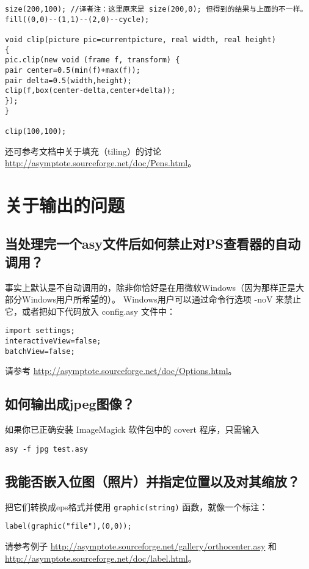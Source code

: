 \begin{lstlisting}
size(200,100); //译者注：这里原来是 size(200,0); 但得到的结果与上面的不一样。
fill((0,0)--(1,1)--(2,0)--cycle);
 
void clip(picture pic=currentpicture, real width, real height) 
{
pic.clip(new void (frame f, transform) { 
pair center=0.5(min(f)+max(f));
pair delta=0.5(width,height);
clip(f,box(center-delta,center+delta));
});
} 
 
clip(100,100);
\end{lstlisting}

还可参考文档中关于填充（tiling）的讨论 \url{http://asymptote.sourceforge.net/doc/Pens.html}。

\section{\label{Q9}关于输出的问题}
\subsection{\label{Q9.1}当处理完一个asy文件后如何禁止对PS查看器的自动调用？}
事实上默认是不自动调用的，除非你恰好是在用微软Windows（因为那样正是大部分Windows用户所希望的）。
Windows用户可以通过命令行选项 -noV 来禁止它，或者把如下代码放入 config.asy 文件中：
\begin{lstlisting}
import settings;
interactiveView=false;
batchView=false;
\end{lstlisting}
请参考 \url{http://asymptote.sourceforge.net/doc/Options.html}。

\subsection{\label{Q9.2}如何输出成jpeg图像？}
如果你已正确安装 ImageMagick 软件包中的 covert 程序，只需输入
\begin{verbatim}
asy -f jpg test.asy 
\end{verbatim}

\subsection{\label{Q9.3}我能否嵌入位图（照片）并指定位置以及对其缩放？}
把它们转换成eps格式并使用 \verb|graphic(string)| 函数，就像一个标注：

\begin{lstlisting}
label(graphic("file"),(0,0));
\end{lstlisting}
请参考例子 \url{http://asymptote.sourceforge.net/gallery/orthocenter.asy} 和 
\url{http://asymptote.sourceforge.net/doc/label.html}。

